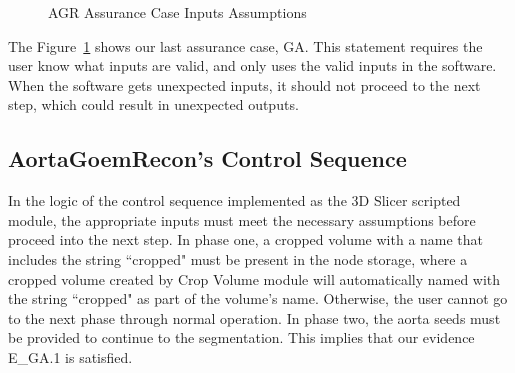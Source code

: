 \begin{figure}[H]
    \centering
    \caption[AGR Assurance Case Inputs Assumptions]{AGR Assurance Case Inputs Assumptions}
    \label{fig_agr_ac_ga}
\end{figure}

The Figure~\ref{fig_agr_ac_ga} shows our last assurance case, GA. This statement requires the user know what inputs are valid, and only uses the valid inputs in the software. When the software gets unexpected inputs, it should not proceed to the next step, which could result in unexpected outputs.

\subsection{AortaGoemRecon's Control Sequence}

In the logic of the control sequence implemented as the 3D Slicer scripted module, the appropriate inputs must meet the necessary assumptions before proceed into the next step.
In phase one, a cropped volume with a name that includes the string ``cropped" must be present in the node storage, where a cropped volume created by Crop Volume module will automatically named with the string ``cropped" as part of the volume's name. Otherwise, the user cannot go to the next phase through normal operation. In phase two, the aorta seeds must be provided to continue to the segmentation. This implies that our evidence E\_GA.1 is satisfied.

